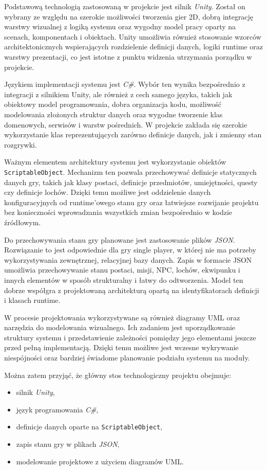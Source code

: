 Podstawową technologią zastosowaną w projekcie jest silnik \emph{Unity}. Został on wybrany ze względu na szerokie możliwości tworzenia gier 2D, dobrą integrację warstwy wizualnej z logiką systemu oraz wygodny model pracy oparty na scenach, komponentach i obiektach. Unity umożliwia również stosowanie wzorców architektonicznych wspierających rozdzielenie definicji danych, logiki runtime oraz warstwy prezentacji, co jest istotne z punktu widzenia utrzymania porządku w projekcie.

Językiem implementacji systemu jest \emph{C\#}. Wybór ten wynika bezpośrednio z integracji z silnikiem Unity, ale również z cech samego języka, takich jak obiektowy model programowania, dobra organizacja kodu, możliwość modelowania złożonych struktur danych oraz wygodne tworzenie klas domenowych, serwisów i warstw pośrednich. W projekcie zakłada się szerokie wykorzystanie klas reprezentujących zarówno definicje danych, jak i zmienny stan rozgrywki.

Ważnym elementem architektury systemu jest wykorzystanie obiektów \texttt{ScriptableObject}. Mechanizm ten pozwala przechowywać definicje statycznych danych gry, takich jak klasy postaci, definicje przedmiotów, umiejętności, questy czy definicje lochów. Dzięki temu możliwe jest oddzielenie danych konfiguracyjnych od runtime'owego stanu gry oraz łatwiejsze rozwijanie projektu bez konieczności wprowadzania wszystkich zmian bezpośrednio w kodzie źródłowym.

Do przechowywania stanu gry planowane jest zastosowanie plików \emph{JSON}. Rozwiązanie to jest odpowiednie dla gry single player, w której nie ma potrzeby wykorzystywania zewnętrznej, relacyjnej bazy danych. Zapis w formacie JSON umożliwia przechowywanie stanu postaci, misji, NPC, lochów, ekwipunku i innych elementów w sposób strukturalny i łatwy do odtworzenia. Model ten dobrze współgra z projektowaną architekturą opartą na identyfikatorach definicji i klasach runtime.

W procesie projektowania wykorzystywane są również diagramy UML oraz narzędzia do modelowania wizualnego. Ich zadaniem jest uporządkowanie struktury systemu i przedstawienie zależności pomiędzy jego elementami jeszcze przed pełną implementacją. Dzięki temu możliwe jest wczesne wykrywanie niespójności oraz bardziej świadome planowanie podziału systemu na moduły.

Można zatem przyjąć, że główny stos technologiczny projektu obejmuje:
\begin{itemize}
    \item silnik \emph{Unity},
    \item język programowania \emph{C\#},
    \item definicje danych oparte na \texttt{ScriptableObject},
    \item zapis stanu gry w plikach \emph{JSON},
    \item modelowanie projektowe z użyciem diagramów UML.
\end{itemize}

